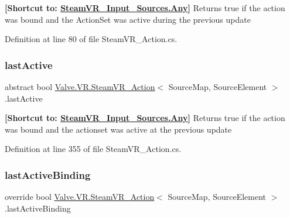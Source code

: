 {\bfseries{\mbox{[}Shortcut to\+: \mbox{\hyperlink{namespace_valve_1_1_v_r_a82e5bf501cc3aa155444ee3f0662853faed36a1ef76a59ee3f15180e0441188ad}{Steam\+V\+R\+\_\+\+Input\+\_\+\+Sources.\+Any}}\mbox{]}}} Returns true if the action was bound and the Action\+Set was active during the previous update 



Definition at line 80 of file Steam\+V\+R\+\_\+\+Action.\+cs.

\mbox{\label{class_valve_1_1_v_r_1_1_steam_v_r___action_a38ff81951fad828a51df2bdd1f3f50f6}} 
\subsubsection{\texorpdfstring{lastActive}{lastActive}\hspace{0.1cm}{\footnotesize\ttfamily [2/2]}}
{\footnotesize\ttfamily abstract bool \mbox{\hyperlink{class_valve_1_1_v_r_1_1_steam_v_r___action}{Valve.\+V\+R.\+Steam\+V\+R\+\_\+\+Action}}$<$ Source\+Map, Source\+Element $>$.last\+Active\hspace{0.3cm}{\ttfamily [get]}}



{\bfseries{\mbox{[}Shortcut to\+: \mbox{\hyperlink{namespace_valve_1_1_v_r_a82e5bf501cc3aa155444ee3f0662853faed36a1ef76a59ee3f15180e0441188ad}{Steam\+V\+R\+\_\+\+Input\+\_\+\+Sources.\+Any}}\mbox{]}}} Returns true if the action was bound and the actionset was active at the previous update 



Definition at line 355 of file Steam\+V\+R\+\_\+\+Action.\+cs.

\mbox{\label{class_valve_1_1_v_r_1_1_steam_v_r___action_ad45e21db94737a22efd0efcab6401fec}} 
\subsubsection{\texorpdfstring{lastActiveBinding}{lastActiveBinding}\hspace{0.1cm}{\footnotesize\ttfamily [1/2]}}
{\footnotesize\ttfamily override bool \mbox{\hyperlink{class_valve_1_1_v_r_1_1_steam_v_r___action}{Valve.\+V\+R.\+Steam\+V\+R\+\_\+\+Action}}$<$ Source\+Map, Source\+Element $>$.last\+Active\+Binding\hspace{0.3cm}{\ttfamily [get]}}



